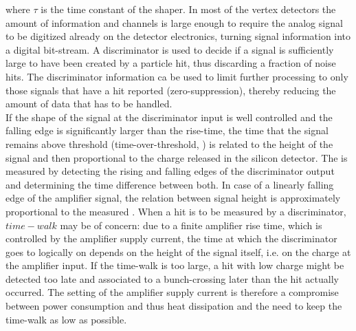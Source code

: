 where $\tau$ is the time constant of the shaper.
In most of the vertex detectors the amount of information and channels is large enough to require the analog signal to be digitized already on the detector electronics, turning signal information into a digital bit-stream.
A discriminator is used to decide if a signal is sufficiently large to have been created by a particle hit, thus discarding a fraction of noise hits. The discriminator information ca be used to limit further processing to only those signals that have a hit reported (zero-suppression), thereby reducing the amount of data that has to be handled.\\
If the shape of the signal at the discriminator input is well controlled and the falling edge is significantly larger than the rise-time, the time that the signal remains above threshold (time-over-threshold, \tot) is related to the height of the signal and then proportional to the charge released in the silicon detector. The \tot is measured by detecting the rising and falling edges of the discriminator output and determining the time difference between both. In case of a linearly falling edge of the amplifier signal, the relation between signal height is approximately proportional to the measured \tot.
When a hit is to be measured by a discriminator, $time-walk$ may be of concern: due to a finite amplifier rise time, which is controlled by the amplifier supply current, the time at which the discriminator goes to logically on depends on the height of the signal itself, i.e. on the charge at the amplifier input. If the time-walk is too large, a hit with low charge might be detected too late and associated to a bunch-crossing later than the hit actually occurred. The setting of the amplifier supply current is therefore a compromise between power consumption and thus heat dissipation and the need to keep the time-walk as low as possible.

